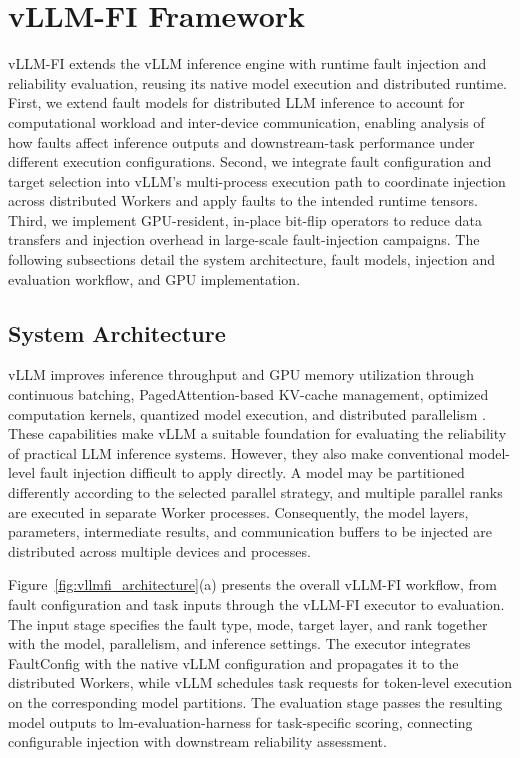 \section{vLLM-FI Framework}
\label{sec:framework}

vLLM-FI extends the vLLM inference engine with runtime fault injection and reliability evaluation, reusing its native model execution and distributed runtime. First, we extend fault models for distributed LLM inference to account for computational workload and inter-device communication, enabling analysis of how faults affect inference outputs and downstream-task performance under different execution configurations. Second, we integrate fault configuration and target selection into vLLM's multi-process execution path to coordinate injection across distributed Workers and apply faults to the intended runtime tensors. Third, we implement GPU-resident, in-place bit-flip operators to reduce data transfers and injection overhead in large-scale fault-injection campaigns. The following subsections detail the system architecture, fault models, injection and evaluation workflow, and GPU implementation.

\subsection{System Architecture}
\label{subsec:architecture}

vLLM improves inference throughput and GPU memory utilization through continuous batching, PagedAttention-based KV-cache management, optimized computation kernels, quantized model execution, and distributed parallelism \cite{kwon2023efficient}. These capabilities make vLLM a suitable foundation for evaluating the reliability of practical LLM inference systems. However, they also make conventional model-level fault injection difficult to apply directly. A model may be partitioned differently according to the selected parallel strategy, and multiple parallel ranks are executed in separate Worker processes. Consequently, the model layers, parameters, intermediate results, and communication buffers to be injected are distributed across multiple devices and processes.

Figure~\ref{fig:vllmfi_architecture}(a) presents the overall vLLM-FI workflow, from fault configuration and task inputs through the vLLM-FI executor to evaluation. The input stage specifies the fault type, mode, target layer, and rank together with the model, parallelism, and inference settings. The executor integrates FaultConfig with the native vLLM configuration and propagates it to the distributed Workers, while vLLM schedules task requests for token-level execution on the corresponding model partitions. The evaluation stage passes the resulting model outputs to lm-evaluation-harness \cite{eval-harness} for task-specific scoring, connecting configurable injection with downstream reliability assessment.

